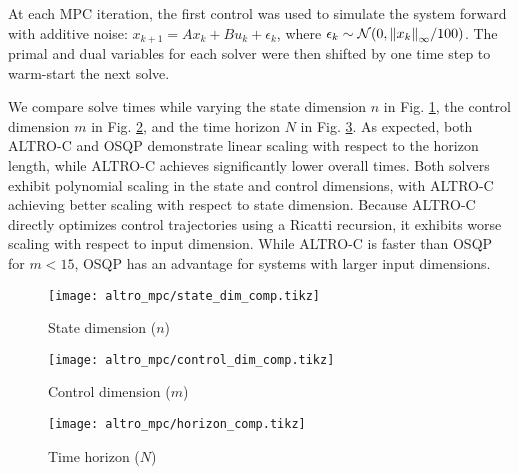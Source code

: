 \documentclass[../root.tex]{subfiles}
\begin{document}
At each MPC iteration, the first control was used to simulate the system
forward with additive noise: $x_{k+1} = A x_k + B u_k + \epsilon_k$, where
$\epsilon_k \sim \mathcal{N}(0,\norm{x_k}_\infty / 100)$. The primal and dual
variables for each solver were then shifted by one time step to warm-start
the next solve.

We compare solve times while varying the state dimension $n$ in Fig.
\ref{fig:state_dim_comp}, the control dimension $m$ in Fig.
\ref{fig:control_dim_comp}, and the time horizon $N$ in Fig.
\ref{fig:osqp_horizon_comp}. As expected, both ALTRO-C and OSQP demonstrate linear
scaling with respect to the horizon length, while ALTRO-C achieves
significantly lower overall times. Both solvers exhibit polynomial scaling in
the state and control dimensions, with ALTRO-C achieving better scaling with
respect to state dimension. Because ALTRO-C directly optimizes control
trajectories using a Ricatti recursion, it exhibits worse scaling with
respect to input dimension. While ALTRO-C is faster than OSQP for $m < 15$,
OSQP has an advantage for systems with larger input dimensions.


\begin{figure*}
    \centering
    \begin{subfigure}{0.32\textwidth}
        \texttt{[image: altro\_mpc/state\_dim\_comp.tikz]}
        \caption{State dimension ($n$)}
        \label{fig:state_dim_comp}
    \end{subfigure}
    \begin{subfigure}{0.32\textwidth}
        \centering
        \texttt{[image: altro\_mpc/control\_dim\_comp.tikz]}
        \caption{Control dimension ($m$)}
        \label{fig:control_dim_comp}
    \end{subfigure}
    \begin{subfigure}{0.32\textwidth}
        \centering
        \texttt{[image: altro\_mpc/horizon\_comp.tikz]}
        \caption{Time horizon ($N$)}
        \label{fig:osqp_horizon_comp}
    \end{subfigure}
    \caption{Comparison of ALTRO-C and OSQP as a function of a) state dimension
    ($N=21,m=2$), b) control dimension ($N=21,n=30$), and c) horizon length
    ($n=12,m=6$). The x-axis is labeled at the sampled sizes.}
\end{figure*}
\end{document}
